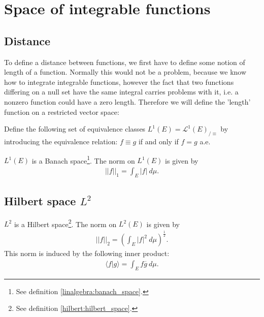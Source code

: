 \section{Space of integrable functions}
\subsection{Distance}

    To define a distance between functions, we first have to define some notion of length of a function. Normally this would not be a problem, because we know how to integrate integrable functions, however the fact that two functions differing on a null set have the same integral carries problems with it, i.e. a nonzero function could have a zero length. Therefore we will define the 'length' function on a restricted vector space:

    \qquad Define the following set of equivalence classes $L^1(E) = \mathcal{L}^1(E)_{/\equiv}$ by introducing the equivalence relation: $f\equiv g$ if and only if $f=g$ a.e.
    \begin{property}
        $L^1(E)$ is a Banach space\footnote{See definition \ref{linalgebra:banach_space}.}. The norm on $L^1(E)$ is given by
        \begin{gather}
            \label{lebesgue:L1_norm}
            ||f||_1 = \int_E |f|\ d\mu.
        \end{gather}
    \end{property}

\subsection{Hilbert space \texorpdfstring{$L^2$}{L2}}\label{lebesgue:section:hilbert_space}

    \begin{property}\label{lebesgue:L2_hilbert_space}
        $L^2$ is a Hilbert space\footnote{See definition \ref{hilbert:hilbert_space}.}. The norm on $L^2(E)$ is given by
        \begin{gather}
            \label{lebesgue:L2_norm}
            ||f||_2 = \left(\int_E |f|^2\ d\mu\right)^{\frac{1}{2}}.
        \end{gather}
        This norm is induced by the following inner product:
        \begin{gather}
            \label{lebesgue:L2_inner_product}
            \langle f|g \rangle = \int_E f\overline{g}\ d\mu.
        \end{gather}
    \end{property}


